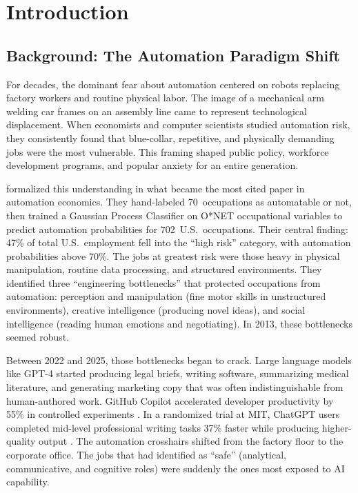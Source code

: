 \chapter{Introduction}
\label{chap:introduction}

\section{Background: The Automation Paradigm Shift}
\label{sec:intro-background}

For decades, the dominant fear about automation centered on robots replacing
factory workers and routine physical labor.  The image of a mechanical arm
welding car frames on an assembly line came to represent technological
displacement.  When economists and computer scientists studied automation
risk, they consistently found that blue-collar, repetitive, and physically
demanding jobs were the most vulnerable.  This framing shaped public policy,
workforce development programs, and popular anxiety for an entire generation.

\citet{Frey_Osborne_2017} formalized this understanding in what became the
most cited paper in automation economics.  They hand-labeled 70~occupations
as automatable or not, then trained a Gaussian Process Classifier on O*NET
occupational variables to predict automation probabilities for
702~U.S.\ occupations.  Their central finding: 47\% of total
U.S.\ employment fell into the ``high risk'' category, with automation
probabilities above 70\%.  The jobs at greatest risk were those heavy in
physical manipulation, routine data processing, and structured environments.
They identified three ``engineering bottlenecks'' that protected occupations
from automation: perception and manipulation (fine motor skills in
unstructured environments), creative intelligence (producing novel ideas),
and social intelligence (reading human emotions and negotiating).  In 2013,
these bottlenecks seemed robust.

Between 2022 and 2025, those bottlenecks began to crack.  Large language
models like GPT-4 started producing legal briefs, writing software,
summarizing medical literature, and generating marketing copy that was often
indistinguishable from human-authored work.  GitHub Copilot accelerated
developer productivity by 55\% in controlled experiments
\citep{Peng_Kalliamvakou_2023}.  In a randomized trial at MIT, ChatGPT
users completed mid-level professional writing tasks 37\% faster while
producing higher-quality output \citep{Noy_Zhang_2023}.  The automation
crosshairs shifted from the factory floor to the corporate office.  The jobs
that \citet{Frey_Osborne_2017} had identified as ``safe'' (analytical,
communicative, and cognitive roles) were suddenly the ones most exposed to AI
capability.

